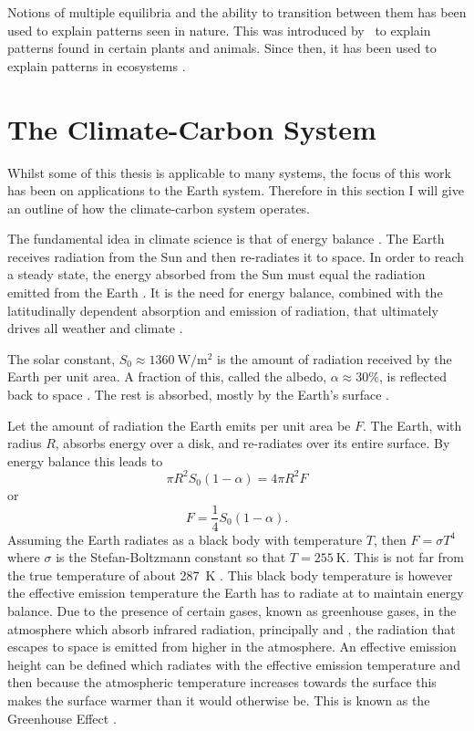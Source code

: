 Notions of multiple equilibria and the ability to transition between them has been used to explain patterns seen in nature. This was introduced by~\cite{Turing1952} to explain
patterns found in certain plants and animals. Since then, it has been used to explain patterns in ecosystems \parencite{Rietkerk2008}.

\section{The Climate-Carbon System}

Whilst some of this thesis is applicable to many systems, the focus of this work has been on applications to the Earth system. Therefore in this section I will give an outline of
how the climate-carbon system operates.

The fundamental idea in climate science is that of energy balance \parencite{North1981}. The Earth receives radiation from the Sun and then re-radiates it to space.
In order to reach a steady state, the energy absorbed from the Sun must equal the radiation emitted from the Earth \parencite{Peixoto1992}. It is the need for energy balance, combined with the
latitudinally dependent absorption and emission of radiation, that ultimately drives all weather and climate \parencite{Lorenz1967}.

The solar constant, $S_0 \approx \SI{1360}{\watt\per\meter\squared}$ \parencite{Johnson1954} is the amount of radiation received by the Earth per unit area.  A fraction of this,
called the albedo, $\alpha \approx 30\%$, is reflected back to space \parencite{Goode2021}. The rest is absorbed, mostly by the Earth's surface \parencite{Trenberth2009}.

Let the amount of radiation the Earth emits per unit area be $F$. The Earth, with radius $R$, absorbs energy over a disk, and re-radiates
over its entire surface. By energy balance this leads to
\begin{equation}
  \pi R^2 S_0 (1-\alpha) = 4 \pi R^2 F
\end{equation}
or
\begin{equation}
  \label{eq:energy_balance}
  F = \frac{1}{4} S_0 \left(1 - \alpha\right).
\end{equation}
Assuming the Earth radiates as a black body with temperature $T$, then $F = \sigma T^4$ where $\sigma$ is the Stefan-Boltzmann constant  so that $T = \SI{255}{\kelvin}$.
This is not far from the true temperature of about \SI{287}{\kelvin} \parencite{Jones1999}.
This black body temperature is however the effective emission temperature the Earth has to radiate at to maintain energy balance. Due to the presence of certain gases, known as
greenhouse gases, in the atmosphere which absorb
infrared radiation, principally  and , the radiation that escapes to space is emitted from higher in the atmosphere. An effective emission height can be defined which
radiates with the effective emission temperature and then because the atmospheric temperature increases towards the surface this makes the surface warmer than it would otherwise be.
This is known as the Greenhouse Effect \parencite{Pierrehumbert2010}.

